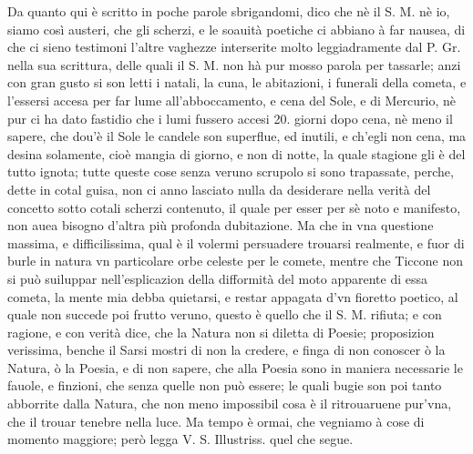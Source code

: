 \documentclass[11pt,twoside,openany]{book}
\begin{document}
Da quanto qui è scritto in poche parole sbrigandomi, dico che nè il S. M. nè io, siamo così austeri, che gli scherzi, e le soauità poetiche ci abbiano à far nausea, di che ci sieno testimoni l'altre vaghezze interserite molto leggiadramente dal P. Gr. nella sua scrittura, delle quali il S. M. non hà pur mosso parola per tassarle; anzi con gran gusto si son letti i natali, la cuna, le abitazioni, i funerali della cometa, e l'essersi accesa per far lume all'abboccamento, e cena del Sole, e di Mercurio, nè pur ci ha dato fastidio che i lumi fussero accesi 20. giorni dopo cena, nè meno il sapere, che dou'è il Sole le candele son superflue, ed inutili, e ch'egli non cena, ma desina solamente, cioè mangia di giorno, e non di notte, la quale stagione gli è del tutto ignota; tutte queste cose senza veruno scrupolo si sono trapassate, perche, dette in cotal guisa, non ci anno lasciato nulla da desiderare nella verità del concetto sotto cotali scherzi contenuto, il quale per esser per sè noto e manifesto, non auea bisogno d'altra più profonda dubitazione. Ma che in vna questione massima, e difficilissima, qual è il volermi persuadere trouarsi realmente, e fuor di burle in natura vn particolare orbe celeste per le comete, mentre che Ticcone non si può suiluppar nell'esplicazion della difformità del moto apparente di essa cometa, la mente mia debba quietarsi, e restar appagata d'vn fioretto poetico, al quale non succede poi frutto veruno, questo è quello che il S. M. rifiuta; e con ragione, e con verità dice, che la Natura non si diletta di Poesie; proposizion verissima, benche il Sarsi mostri di non la credere, e finga di non conoscer ò la Natura, ò la Poesia, e di non sapere, che alla Poesia sono in maniera necessarie le fauole, e finzioni, che senza quelle non può essere; le quali bugie son poi tanto abborrite dalla Natura, che non meno impossibil cosa è il ritrouaruene pur'vna, che il trouar tenebre nella luce. Ma tempo è ormai, che vegniamo à cose di momento maggiore; però legga V. S. Illustriss. quel che segue.
\end{document}
